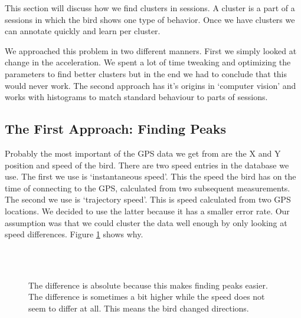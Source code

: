 This section will discuss how we find clusters in sessions. A cluster is a 
part of a sessions in which the bird shows one type of behavior. Once we have
clusters we can annotate quickly and learn per cluster.

We approached this problem in two different manners. First we simply looked at
change in the acceleration. We spent a lot of time tweaking and optimizing the parameters
to find better clusters but in the end we had to conclude that this would never work. 
The second
approach has it's origins in `computer vision' %
and works with histograms to 
match standard behaviour to parts of sessions.

\subsection{The First Approach: Finding Peaks}
 Probably the most important of the GPS data we get from \bits are the X and Y
 position and speed of the bird. There are two speed entries in the database we
 use. The first we use is `instantaneous speed'.    
This the speed the bird has on the time of
 connecting to the GPS, calculated from two subsequent measurements. The second
we use is 
 `trajectory speed'. This is speed calculated from two GPS locations. 
We decided to use the latter because it has a smaller error rate. 
 Our assumption was that we could cluster the data well 
 enough by only looking at speed differences. Figure \ref{fig:speed} shows
 why.

\begin{figure}
  \centering
   \\
   \\
  \caption{The difference is absolute because this makes finding peaks easier. The difference is sometimes a bit higher while the speed does not seem to differ at all. This means the bird changed directions.}
  \label{fig:speed}
\end{figure}

